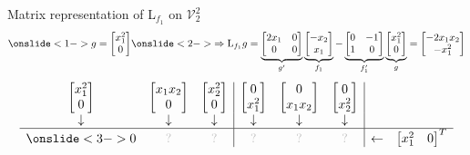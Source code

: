 \documentclass[10pt,T]{beamer}
\newcommand{\transparent}[1]{\textcolor{lightgray}{#1}}
\begin{document}
\begin{frame}[b]{Matrix representation of L$_{f_1}$ on $\mathcal{V}_2^2$}
\begin{equation*}
  \onslide<1->{g=\begin{bmatrix}x_1^2\\0\end{bmatrix}}
  \onslide<2->{\Rightarrow\text{L}_{f_1}g=\underbrace{\begin{bmatrix}2x_1&0\\0&0\end{bmatrix}}_{g'}\underbrace{\begin{bmatrix}-x_2\\x_1\end{bmatrix}}_{f_1}
    -\underbrace{\begin{bmatrix}0&-1\\1&0\end{bmatrix}}_{f_1'}\underbrace{\begin{bmatrix}x_1^2\\0\end{bmatrix}}_{g}=\begin{bmatrix}-2x_1x_2\\-x_1^2\end{bmatrix}}
\end{equation*}
\begin{equation*}
  \begin{array}{ccc|ccc|cc}
    \begin{bmatrix}x_1^2\\0\end{bmatrix}&\begin{bmatrix}x_1x_2\\0\end{bmatrix}&\begin{bmatrix}x_2^2\\0\end{bmatrix}&\begin{bmatrix}0\\x_1^2\end{bmatrix}&\begin{bmatrix}0\\x_1x_2\end{bmatrix}&\begin{bmatrix}0\\x_2^2\end{bmatrix}&&\\
    \downarrow&\downarrow&\downarrow&\downarrow&\downarrow&\downarrow&&\\\hline
    \onslide<3->{0}&\transparent{?}&\transparent{?}&\transparent{?}&\transparent{?}&\transparent{?}&\leftarrow&\begin{bmatrix}x_1^2&0\end{bmatrix}^T\\

\end{array}
\end{equation*}
\end{frame}
\end{document}
